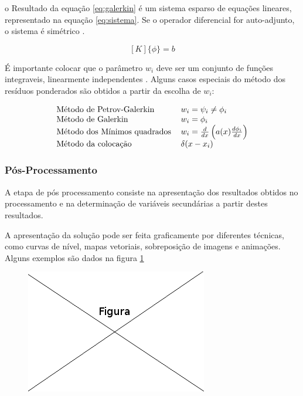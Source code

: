 \documentclass[
    12pt,               %
    openright,          %
    oneside,
    a4paper,            %
    english,            %
    french,             %
    spanish,            %
    brazil              %
    ]{abntex2}
\begin{document}
  
  o Resultado da equação \ref{eq:galerkin} é um sistema esparso de equações lineares, representado na equação \ref{eq:sistema}. Se o operador diferencial for auto-adjunto, o sistema é simétrico \cite[p. 36]{volakis}.
  
    \begin{equation}
        \label{eq:sistema}
        [K]\{\phi\} = {b}
    \end{equation}  

É importante colocar que o parâmetro $w_i$ deve ser um conjunto de funções integraveis, linearmente independentes
\cite[p. 60]{reddy}. Alguns casos especiais do método dos resíduos ponderados são obtidos a partir da escolha de $w_i$:

\begin{equation}
\label{eq:metPond}
    \begin{tabular}{ l l }
    Método de Petrov-Galerkin & $ w_i = \psi_i \neq \phi_i $ \\ 
    Método de Galerkin & $ w_i = \phi_i $\\  
    Método dos Mínimos quadrados & $ w_i = \frac{d}{dx} \left(a(x)\frac{d \phi_i}{dx}\right) $ \\ 
    Método da colocação & $ \delta(x - x_i)  $ 
    \end{tabular}
\end{equation}





\subsubsection{Pós-Processamento}
A etapa de pós processamento consiste na apresentação dos resultados obtidos no processamento e na determinação de variáveis secundárias a partir destes resultados.

A apresentação da solução pode ser feita graficamente por diferentes técnicas, como curvas de nível, mapas vetoriais, sobreposição de imagens e animações. Alguns exemplos são dados na figura \ref{fig:graf}

\begin{figure}[!htb]
\centering
\includegraphics[scale=0.5]{figuras/temp.png}
\caption{}
\label{fig:graf}
\end{figure}
\end{document}
